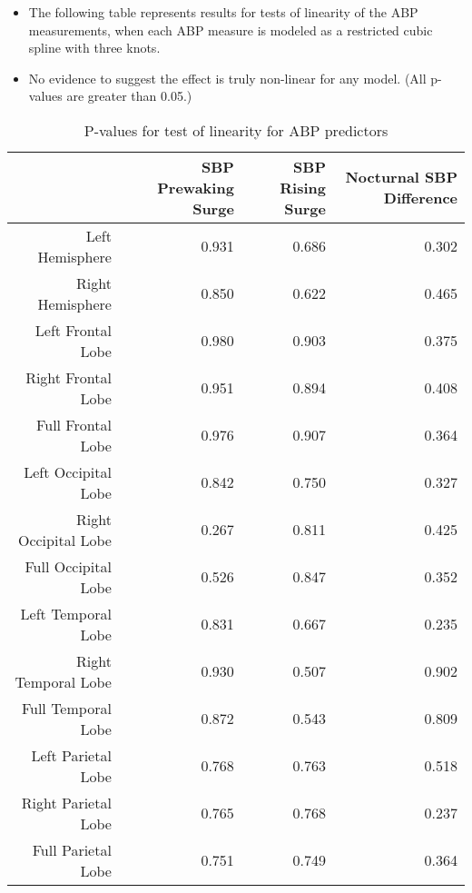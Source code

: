 \documentclass[10pt]{article}\usepackage[]{graphicx}\usepackage[]{color}
\begin{document}
\begin{itemize}
  \item The following table represents results for tests of linearity of the ABP measurements, when each ABP measure is modeled as a restricted cubic spline with three knots. 
  \item No evidence to suggest the effect is truly non-linear for any model. (All p-values are greater than 0.05.)
\end{itemize}

\begin{table}[ht]
\centering
\caption{P-values for test of linearity for ABP predictors} 
\begin{tabular}{rrrr}
  \hline
 & SBP Prewaking Surge & SBP Rising Surge & Nocturnal SBP Difference \\ 
  \hline
Left Hemisphere & 0.931 & 0.686 & 0.302 \\ 
  Right Hemisphere & 0.850 & 0.622 & 0.465 \\ 
  Left Frontal Lobe & 0.980 & 0.903 & 0.375 \\ 
  Right Frontal Lobe & 0.951 & 0.894 & 0.408 \\ 
  Full Frontal Lobe & 0.976 & 0.907 & 0.364 \\ 
  Left Occipital Lobe & 0.842 & 0.750 & 0.327 \\ 
  Right Occipital Lobe & 0.267 & 0.811 & 0.425 \\ 
  Full Occipital Lobe & 0.526 & 0.847 & 0.352 \\ 
  Left Temporal Lobe & 0.831 & 0.667 & 0.235 \\ 
  Right Temporal Lobe & 0.930 & 0.507 & 0.902 \\ 
  Full Temporal Lobe & 0.872 & 0.543 & 0.809 \\ 
  Left Parietal Lobe & 0.768 & 0.763 & 0.518 \\ 
  Right Parietal Lobe & 0.765 & 0.768 & 0.237 \\ 
  Full Parietal Lobe & 0.751 & 0.749 & 0.364 \\ 
   \hline
\end{tabular}
\end{table}
\end{document}
